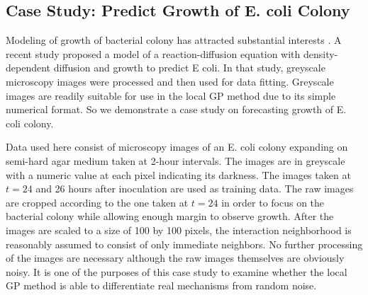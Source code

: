 \documentclass[smallextended,natbib]{svjour3}       %
\begin{document}
\subsection{Case Study: Predict Growth of E. coli Colony} 
Modeling of growth of bacterial colony has attracted substantial interests \citep{mimura2000reaction,kawasaki1997modeling,leyva2013effects}. A recent study \citep{he2020predictive} proposed a model of a reaction-diffusion equation with density-dependent diffusion and growth to predict E coli. In that study, greyscale microscopy images were processed and then used for data fitting. Greyscale images are readily suitable for use in the local GP method due to its simple numerical format. So we demonstrate a case study on forecasting growth of E. coli colony.

Data used here consist of microscopy images of an E. coli colony expanding on semi-hard agar medium taken at 2-hour intervals. The images are in greyscale with a numeric value at each pixel indicating its darkness. The images taken at $t=24$ and 26 hours after inoculation are used as training data. The raw images are cropped  according to the one taken at $t=24$ in order to focus on the bacterial colony while allowing enough margin to observe growth. After the images are scaled to a size of 100 by 100 pixels, the interaction neighborhood is reasonably assumed to consist of only immediate neighbors. No further processing of the images are necessary although the raw images themselves are obviously noisy. It is one of the purposes of this case study to examine whether the local GP method is able to differentiate real mechanisms from random noise.
\end{document}
